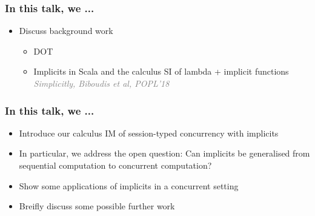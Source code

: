 \begin{frame}
    \titlepage
\end{frame}

\begin{frame}
    \frametitle{In this talk, we ...}
    \begin{itemize}
        \pause
        \item Discuss background work
        \begin{itemize}
            \pause
            \item DOT \TODOTHIS
            \pause
            \item Implicits in Scala and the calculus SI of lambda + implicit
                functions \\
                \textcolor{grey}{\emph{Simplicitly, Biboudis et al, POPL'18}}
        \end{itemize}
    \end{itemize}
\end{frame}

\begin{frame}
    \frametitle{In this talk, we ...}
    \begin{itemize}
        \item Introduce our calculus IM of session-typed concurrency with
            implicits
        \pause
        \item In particular, we address the open question: Can implicits be
            generalised from sequential computation to concurrent computation?
        \pause
        \item Show some applications of implicits in a concurrent setting
        \pause
        \item Breifly discuss some possible further work
    \end{itemize}
\end{frame}

\begin{frame}
\end{frame}

